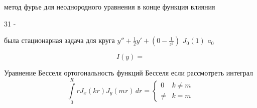 метод фурье для неоднородного уравнения
в конце функция влияния

31 - 

была стационарная задача для круга
$y'' + \frac{1}{2} y' + (0 - \frac{1}{z^2})$
$J_0(1)$
$a_0$

\[
    I(y) = 
\]


Уравнение Бесселя
ортогональность функций Бесселя
если рассмотреть интеграл
\[
    \int\limits_0^R r J_x(kr) J_y (m r) \,dr = \begin{cases} 0 &k \neq m\\ \neq & k = m\end{cases}
\]
